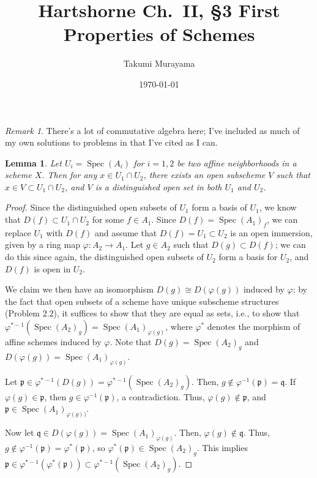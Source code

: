 \documentclass[12pt,letterpaper]{article}
\title{Hartshorne Ch.~II, \S3 First Properties of Schemes}
\author{Takumi Murayama}
\date{\today}
\newtheorem{lemma}{Lemma}
\theoremstyle{definition}
\theoremstyle{remark}
\newtheorem*{remark}{Remark}
\numberwithin{equation}{section}
\numberwithin{figure}{problem}
\DeclareMathOperator{\Spec}{Spec}
\begin{document}
\maketitle
\setcounter{section}{3}
\begin{remark}
  There's a lot of commutative algebra here; I've included as much of my own solutions to problems in \cite{AM69} that I've cited as I can.
\end{remark}
\begin{lemma}\label{niketrick}
  Let $U_i = \Spec(A_i)$ for $i=1,2$ be two affine neighborhoods in a scheme $X$. Then for any $x \in U_1 \cap U_2$, there exists an open subscheme $V$ such that $x \in V \subset U_1 \cap U_2$, and $V$ is a distinguished open set in both $U_1$ and $U_2$.
\end{lemma}
\begin{proof}
  Since the distinguished open subsets of $U_1$ form a basis of $U_1$, we know that $D(f) \subset U_1 \cap U_2$ for some $f \in A_1$. Since $D(f) = \Spec (A_1)_f$, we can replace $U_1$ with $D(f)$ and assume that $D(f) = U_1 \subset U_2$ is an open immersion, given by a ring map $\varphi\colon A_2 \to A_1$. Let $g \in A_2$ such that $D(g) \subset D(f)$; we can do this since again, the distinguished open subsets of $U_2$ form a basis for $U_2$, and $D(f)$ is open in $U_2$.
  \par We claim we then have an isomorphism $D(g) \cong D(\varphi(g))$ induced by $\varphi$; by the fact that open subsets of a scheme have unique subscheme structures (Problem $2.2$), it suffices to show that they are equal as sets, i.e., to show that $\varphi^{*-1}(\Spec(A_2)_g) = \Spec(A_1)_{\varphi(g)}$, where $\varphi^*$ denotes the morphism of affine schemes induced by $\varphi$. Note that $D(g) = \Spec (A_2)_g$ and $D(\varphi(g)) = \Spec(A_1)_{\varphi(g)}$.
  \par Let $\mathfrak{p} \in \varphi^{*-1}(D(g)) = \varphi^{*-1}(\Spec (A_2)_g)$. Then, $g \notin \varphi^{-1}(\mathfrak{p}) = \mathfrak{q}$. If $\varphi(g) \in \mathfrak{p}$, then $g \in \varphi^{-1}(\mathfrak{p})$, a contradiction. Thus, $\varphi(g) \notin \mathfrak{p}$, and $\mathfrak{p} \in \Spec (A_1)_{\varphi(g))}$.
  \par Now let $\mathfrak{q} \in D(\varphi(g)) = \Spec(A_1)_{\varphi(g)}$. Then, $\varphi(g) \notin \mathfrak{q}$. Thus, $g \notin \varphi^{-1}(\mathfrak{p}) = \varphi^*(\mathfrak{p})$, so $\varphi^*(\mathfrak{p}) \in \Spec(A_2)_g$. This implies $\mathfrak{p} \in \varphi^{*-1}(\varphi^*(\mathfrak{p})) \subset \varphi^{*-1}(\Spec (A_2)_g)$.
\end{proof}
\end{document}
